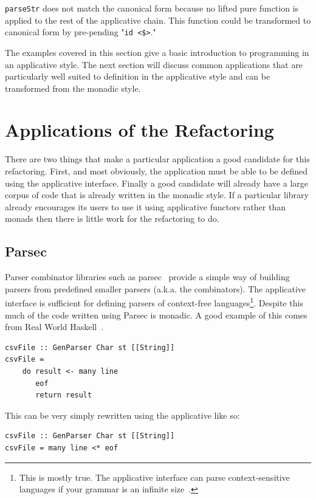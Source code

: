 \texttt{parseStr} does not match the canonical form because no lifted pure function is applied to the rest of the applicative chain. This function could be transformed to canonical form by pre-pending "\texttt{id <\$>}."

The examples covered in this section give a basic introduction to programming in an applicative style. The next section will discuss common applications that are particularly well suited to definition in the applicative style and can be transformed from the monadic style. 

\section{Applications of the Refactoring}
\label{sec:appApps}

There are two things that make a particular application a good candidate for this refactoring. First, and most obviously, the application must be able to be defined using the applicative interface. Finally a good candidate will already have a large corpus of code that is already written in the monadic style. If a particular library already encourages its users to use it using applicative functors rather than monads then there is little work for the refactoring to do.

\subsection{Parsec}
Parser combinator libraries such as parsec~\citep{parsec} provide a simple way of building parsers from predefined smaller parsers (a.k.a. the combinators). The applicative interface is sufficient for defining parsers of context-free languages\footnote{This is mostly true. The applicative interface can parse context-sensitive languages if your grammar is an infinite size~\citep{appContextSens}.}. Despite this much of the code written using Parsec is monadic. A good example of this comes from Real World Haskell~\citep{realWorldHaskell}.

\begin{lstlisting}[frame=tblr]
csvFile :: GenParser Char st [[String]]
csvFile = 
    do result <- many line
       eof
       return result
\end{lstlisting}

This can be very simply rewritten using the applicative like so:

\begin{lstlisting}[frame=tblr]
csvFile :: GenParser Char st [[String]]
csvFile = many line <* eof 
\end{lstlisting}      
 
